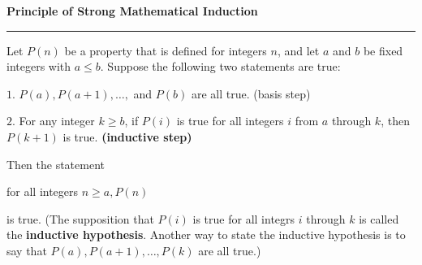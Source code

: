 \nopagenumbers
{\bf Principle of Strong Mathematical Induction}
\vskip 1mm
\hrule

\vskip 6pt
Let $P(n)$ be a property that is defined for integers $n$, and let $a$ and $b$ be fixed integers with $a\leq b$. Suppose the following two statements are true:

\vskip 3mm
$1.$ $P(a),P(a+1),\ldots ,$ and $P(b)$ are all true. {(basis step)}

\vskip 1mm
$2.$ For any integer $k\geq b$, if $P(i)$ is true for all integers $i$ from $a$ through $k$, then $P(k+1)$ is true. {\bf (inductive step)}

\vskip 1mm
Then the statement

\vskip 1mm
\centerline{for all integers $n\geq a, P(n)$}

\vskip 1mm
is true. (The supposition that $P(i)$ is true for all integrs $i$ through $k$ is called the {\bf inductive hypothesis}. Another way to state the inductive hypothesis is to say that $P(a),P(a+1),\ldots , P(k)$ are all true.)



\vfill\eject
